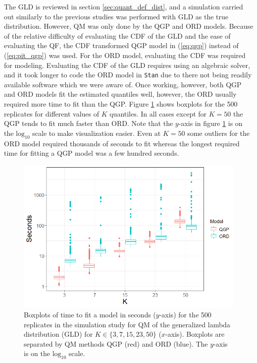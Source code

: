 \documentclass[preprint,12pt,authoryear]{elsarticle}
\begin{document}
The GLD is reviewed in section \ref{sec:quant_def_dist}, and a simulation carried out similarly to the previous studies was performed with GLD as the true distribution. However, QM was only done by the QGP and ORD models. Because of the relative difficulty of evaluating the CDF of the GLD and the ease of evaluating the QF, the CDF transformed QGP model in (\ref{eq:qgp}) instead of (\ref{eq:pit_qgp}) was used. For the ORD model, evaluating the CDF was required for modeling. Evaluating the CDF of the GLD requires using an algebraic solver, and it took longer to code the ORD model in \texttt{Stan} due to there not being readily available software which we were aware of. Once working, however, both QGP and ORD models fit the estimated quantiles well, however, the ORD usually required more time to fit than the QGP. Figure \ref{fig:tuk_time} shows boxplots for the 500 replicates for different values of $K$ quantiles. In all cases except for $K=50$ the QGP tends to fit much faster than ORD. Note that the $y$-axis in figure \ref{fig:tuk_time} is on the $\text{log}_{10}$ scale to make visualization easier. Even at $K=50$ some outliers for the ORD model required thousands of seconds to fit whereas the longest required time for fitting a QGP model was a few hundred seconds.


\begin{figure}
    \centering
    \includegraphics[scale=.6]{Images/tukey_time_log10.png}
    \caption{Boxplots of time to fit a model in seconds ($y$-axis) for the 500 replicates in the simulation study for QM of the generalized lambda distribution (GLD) for $K \in \{3, 7, 15, 23, 50\}$ ($x$-axis). Boxplots are separated by QM methods QGP (red) and ORD (blue). The $y$-axis is on the $\text{log}_{10}$ scale.}
    \label{fig:tuk_time}
\end{figure}
\end{document}
